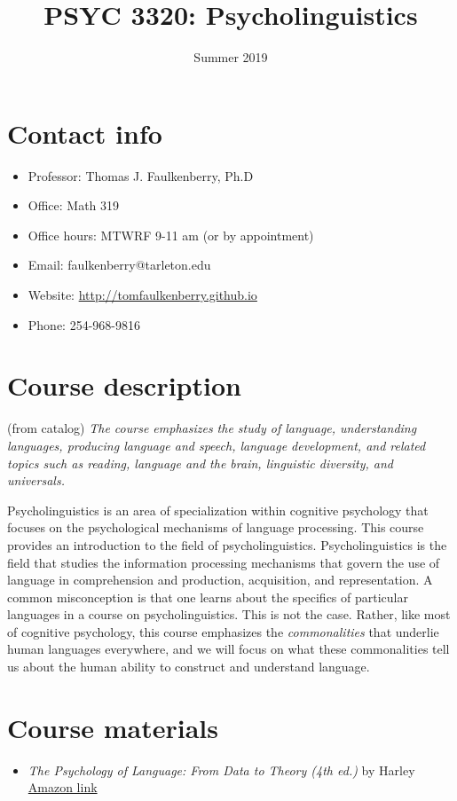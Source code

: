 \documentclass[10pt]{article}
\date{Summer 2019}
\title{PSYC 3320: Psycholinguistics}
\begin{document}
\maketitle

\section*{Contact info}
\label{sec:org04d716f}
\begin{itemize}
\item Professor: Thomas J. Faulkenberry, Ph.D
\item Office: Math 319
\item Office hours: MTWRF 9-11 am (or by appointment)
\item Email: faulkenberry@tarleton.edu
\item Website: \url{http://tomfaulkenberry.github.io}
\item Phone: 254-968-9816
\end{itemize}

\section*{Course description}
\label{sec:org564955d}

(from catalog) \emph{The course emphasizes the study of language, understanding languages, producing language and speech, language development, and related topics such as reading, language and the brain, linguistic diversity, and universals.}

Psycholinguistics is an area of specialization within cognitive psychology that focuses on the psychological mechanisms of language processing.  This course provides an introduction to the field of psycholinguistics. Psycholinguistics is the field that studies the information processing mechanisms that govern the use of language in comprehension and production, acquisition, and representation.  A common misconception is that one learns about the specifics of particular languages in a course on psycholinguistics.  This is not the case.  Rather, like most of cognitive psychology, this course emphasizes the \emph{commonalities} that underlie human languages everywhere, and we will focus on what these commonalities tell us about the human ability to construct and understand language. 

\section*{Course materials}
\label{sec:org840d462}
\begin{itemize}
\item \emph{The Psychology of Language: From Data to Theory (4th ed.)} by Harley \href{https://www.amazon.com/Psychology-Language-Data-Theory/dp/1848720890}{Amazon link}
\end{itemize}
\end{document}
